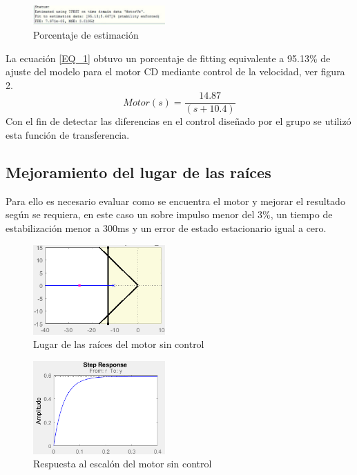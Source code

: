 \documentclass[conference]{IEEEtran}
\begin{document}
\begin{figure}[!h]
\centering
\includegraphics[width=0.45\textwidth]{images/img01.jpeg}
\caption{Porcentaje de estimación }
\label{fig:rlocus1}
\end{figure}

La ecuación \ref{EQ_1} obtuvo un porcentaje de fitting equivalente a 95.13\% de ajuste del modelo para el motor CD mediante control de la velocidad, ver figura 2.
\begin{equation}
    Motor(s)= \dfrac{14.87}{(s+10.4)}
    \label{EQ_1}
\end{equation}
Con el fin de detectar las diferencias en el control diseñado por el grupo se utilizó esta función de transferencia.

\subsection{Mejoramiento del lugar de las raíces }

Para ello es necesario evaluar como se encuentra el motor y mejorar el resultado según se requiera, en este caso un sobre impulso menor del 3$\%$, un tiempo de estabilización menor a 300ms y un error de estado estacionario igual a cero.
\begin{figure}[!h]
\centering
\includegraphics[width=0.45\textwidth]{images/rlocusnocontrol.png}
\caption{Lugar de las raíces del motor sin control}
\label{fig:rlocus1}
\end{figure}

\begin{figure}[!h]
\centering
\includegraphics[width=0.45\textwidth]{images/stepnocontrol.png}
\caption{Respuesta al escalón del motor sin control}
\label{fig:step1}
\end{figure}
\end{document}
